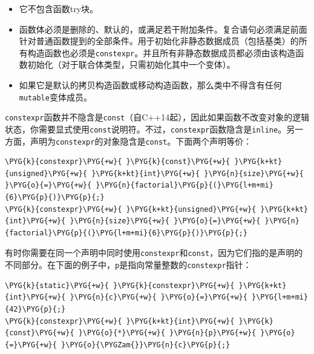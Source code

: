 \begin{itemize}
\begin{itemize}

\item 它不包含函数try块。



\item 函数体必须是删除的、默认的，或满足若干附加条件。复合语句必须满足前面针对普通函数提到的全部条件。用于初始化非静态数据成员（包括基类）的所有构造函数也必须是\texttt{constexpr}。并且所有非静态数据成员都必须由该构造函数初始化（对于联合体类型，只需初始化其中一个变体）。



\item 如果它是默认的拷贝构造函数或移动构造函数，那么类中不得含有任何\texttt{mutable}变体成员。

\end{itemize}

\end{itemize}



\texttt{constexpr}函数并不隐含是\texttt{const}（自C++14起），因此如果函数不改变对象的逻辑状态，你需要显式使用\texttt{const}说明符。不过，\texttt{constexpr}函数隐含是\texttt{inline}。另一方面，声明为\texttt{constexpr}的对象隐含是\texttt{const}。下面两个声明等价：



\begin{codeblockbg}
\begin{Verbatim}[commandchars=\\\{\},breaklines=true,breakanywhere=true,fontsize=\codefont,xleftmargin=17bp]
\PYG{k}{constexpr}\PYG{+w}{ }\PYG{k}{const}\PYG{+w}{ }\PYG{k+kt}{unsigned}\PYG{+w}{ }\PYG{k+kt}{int}\PYG{+w}{ }\PYG{n}{size}\PYG{+w}{ }\PYG{o}{=}\PYG{+w}{ }\PYG{n}{factorial}\PYG{p}{(}\PYG{l+m+mi}{6}\PYG{p}{)}\PYG{p}{;}
\PYG{k}{constexpr}\PYG{+w}{ }\PYG{k+kt}{unsigned}\PYG{+w}{ }\PYG{k+kt}{int}\PYG{+w}{ }\PYG{n}{size}\PYG{+w}{ }\PYG{o}{=}\PYG{+w}{ }\PYG{n}{factorial}\PYG{p}{(}\PYG{l+m+mi}{6}\PYG{p}{)}\PYG{p}{;}
\end{Verbatim}
\end{codeblockbg}



有时你需要在同一个声明中同时使用\texttt{constexpr}和\texttt{const}，因为它们指的是声明的不同部分。在下面的例子中，\texttt{p}是指向常量整数的\texttt{constexpr}指针：



\begin{codeblockbg}
\begin{Verbatim}[commandchars=\\\{\},breaklines=true,breakanywhere=true,fontsize=\codefont,xleftmargin=17bp]
\PYG{k}{static}\PYG{+w}{ }\PYG{k}{constexpr}\PYG{+w}{ }\PYG{k+kt}{int}\PYG{+w}{ }\PYG{n}{c}\PYG{+w}{ }\PYG{o}{=}\PYG{+w}{ }\PYG{l+m+mi}{42}\PYG{p}{;}
\PYG{k}{constexpr}\PYG{+w}{ }\PYG{k+kt}{int}\PYG{+w}{ }\PYG{k}{const}\PYG{+w}{ }\PYG{o}{*}\PYG{+w}{ }\PYG{n}{p}\PYG{+w}{ }\PYG{o}{=}\PYG{+w}{ }\PYG{o}{\PYGZam{}}\PYG{n}{c}\PYG{p}{;}
\end{Verbatim}
\end{codeblockbg}


